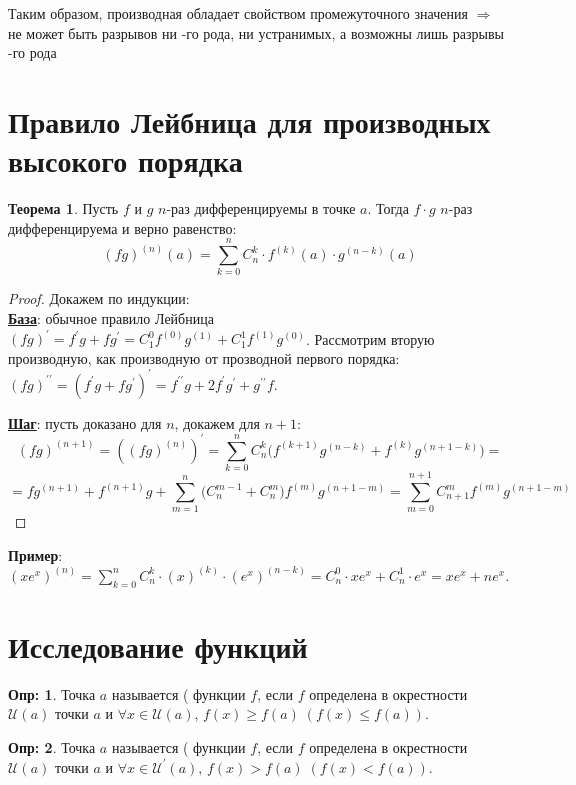 \documentclass[12pt]{article}
\newcommand{\RN}[1]{%
	\textup{\uppercase\expandafter{\romannumeral#1}}%
}
\newcommand{\MU}{\mathcal{U}}
\theoremstyle{definition}
\newtheorem{defn}{Опр:}
\newtheorem{theorem}{Теорема}
\begin{document}
Таким образом, производная обладает свойством промежуточного значения $\Rightarrow$ не может быть разрывов ни \RN{1}-го рода, ни устранимых, а возможны лишь разрывы \RN{2}-го рода

\section*{Правило Лейбница для производных высокого порядка}
\begin{theorem}
	Пусть $f$ и $g$ $n$-раз дифференцируемы в точке $a$. Тогда $f{\cdot}g$  $n$-раз дифференцируема и верно равенство:
	$$(fg)^{(n)}(a) = \sum\limits_{k = 0}^{n}C_n^k{\cdot}f^{(k)}(a){\cdot}g^{(n-k)}(a)$$
\end{theorem}
\begin{proof} Докажем по индукции:\\
	\uline{\textbf{База}}: обычное правило Лейбница $(fg)^\prime = f^\prime g + fg^\prime = C_1^0 f^{(0)}g^{(1)} + C_1^1 f^{(1)}g^{(0)}$. Рассмотрим вторую производную, как производную от прозводной первого порядка: $(fg)^{\prime\prime} = (f^\prime g + fg^\prime)^\prime = f^{\prime\prime}g + 2f^\prime g^\prime + g^{\prime\prime}f$.
	
	\uline{\textbf{Шаг}}: пусть доказано для $n$, докажем для $n +1$:
	$$(fg)^{(n+1)} = ((fg)^{(n)})^\prime =  \sum\limits_{k=0}^{n}C_n^k \big(f^{(k+1)}g^{(n - k)} + f^{(k)}g^{(n + 1 - k)}\big) = $$ 
	$$= fg^{(n+1)} + f^{(n+1)}g + \sum\limits_{m=1}^{n} \big(C_n^{m-1} + C_n^m \big) f^{(m)}g^{(n+1-m)}  = \sum\limits_{m=0}^{n + 1} C_{n+1}^m f^{(m)}g^{(n + 1 - m)}$$
\end{proof}

\textbf{Пример}: $(xe^x)^{(n)} = \displaystyle \sum\limits_{k = 0}^{n}C_n^k{\cdot}(x)^{(k)}{\cdot}(e^x)^{(n-k)} = C_n^0{\cdot}xe^x + C_n^1{\cdot}e^x = xe^x + ne^x$.

\newpage
\section*{Исследование функций}
\begin{defn}
	Точка $a$ называется  ( функции $f$, если $f$ определена в окрестности $\MU(a)$ точки $a$ и $\forall x \in \MU(a), \, f(x) \geq f(a) \; (f(x) \leq f(a))$. 
\end{defn}

\begin{defn}
	Точка $a$ называется  (  функции $f$, если $f$ определена в окрестности $\MU(a)$ точки $a$ и $\forall x \in \MU^\prime(a), \, f(x) > f(a) \; (f(x) < f(a))$. 
\end{defn}
\end{document}
